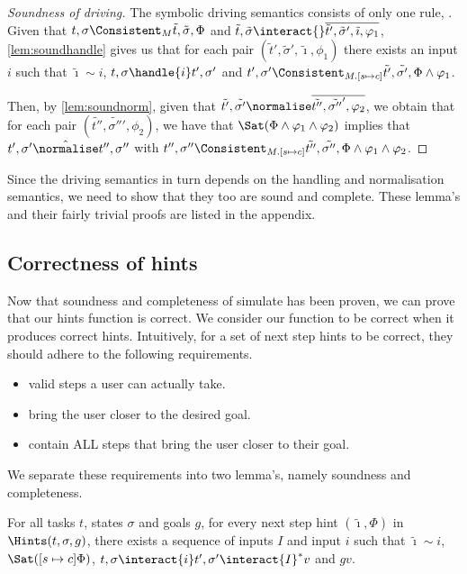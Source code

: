 \begin{proof}[Soundness of driving]
  The symbolic driving semantics consists of only one rule, .
  Given that $t,\sigma\Consistent_M\tilde{t},\tilde{\sigma},\Phi$ and $\tilde{t},\tilde{\sigma}\interact{}\overline{\tilde{t}',\tilde{\sigma}',\tilde{\imath},\phi_1}$,
  \cref{lem:soundhandle} gives us that for each pair $(\tilde{t}',\tilde{\sigma}',\tilde{\imath},\phi_1)$
  there exists an input $i$ such that $\tilde{\imath}\sim i$, $t,\sigma\handle{i}t',\sigma'$
  and $t',\sigma'\Consistent_{M.[s\mapsto c]}\tilde{t'},\tilde{\sigma'},\Phi\land\phi_1$.

  Then, by \cref{lem:soundnorm}, given that $\tilde{t'},\tilde{\sigma'}\normalise\overline{\tilde{t''},\tilde{\sigma''}',\phi_2}$,
  we obtain that for each pair $(\tilde{t''},\tilde{\sigma''}',\phi_2)$, we have that $\Sat(\Phi\land\phi_1\land\phi_2)$ implies
  that $t',\sigma'\hat{\normalise}t'',\sigma''$ with $t'',\sigma''\Consistent_{M.[s\mapsto c]}\tilde{t''},\tilde{\sigma''},\Phi\land\phi_1\land\phi_2$.
\end{proof}

Since the driving semantics in turn depends on the handling and normalisation semantics, we need to show that they too are sound and complete.
These lemma's and their fairly trivial proofs are listed in the appendix.


\subsection{Correctness of hints}

Now that soundness and completeness of simulate has been proven, we can prove that our hints function is correct.
We consider our function to be correct when it produces correct hints.
Intuitively, for a set of next step hints to be correct, they should adhere to the following requirements.

\begin{itemize}
  \item valid steps a user can actually take.
  \item bring the user closer to the desired goal.
  \item contain ALL steps that bring the user closer to their goal.
\end{itemize}

We separate these requirements into two lemma's, namely soundness and completeness.

\begin{theorem}
  \label{thm:soundhint}

For all tasks $t$, states $\sigma$ and goals $g$,
for every next step hint $(\tilde{\imath},\Phi)$ in $\Hints(t,\sigma,g)$,
there exists a sequence of inputs $I$ and input $i$ such that $\tilde{\imath}\sim i$,
$\Sat([s\mapsto c]\Phi)$, $t,\sigma\interact{i} t',\sigma'\interact{I}^* v$ and $gv$.
\end{theorem}

